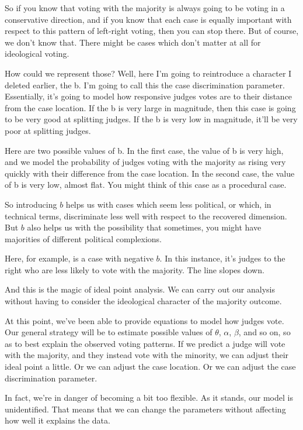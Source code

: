 \documentclass[12pt,twoside]{article}
\begin{document}
So if you know that voting with the majority is always going to be
voting in a conservative direction, and if you know that each case is
equally important with respect to this pattern of left-right voting,
then you can stop there. But of course, we don't know that. There might
be cases which don't matter at all for ideological voting.

How could we represent those? Well, here I'm going to reintroduce a
character I deleted earlier, the b. I'm going to call this the case
discrimination parameter. Essentially, it's going to model how
responsive judges votes are to their distance from the case location. If
the b is very large in magnitude, then this case is going to be very
good at splitting judges. If the b is very low in magnitude, it'll be
very poor at splitting judges.

Here are two possible values of b. In the first case, the value of b is
very high, and we model the probability of judges voting with the
majority as rising very quickly with their difference from the case
location. In the second case, the value of b is very low, almost flat.
You might think of this case as a procedural case.

So introducing \(b\) helps us with cases which seem less political, or
which, in technical terms, discriminate less well with respect to the
recovered dimension. But \(b\) also helps us with the possibility that
sometimes, you might have majorities of different political complexions.

Here, for example, is a case with negative \(b\). In this instance, it's
judges to the right who are less likely to vote with the majority. The
line slopes down.

And this is the magic of ideal point analysis. We can carry out our
analysis without having to consider the ideological character of the
majority outcome.

At this point, we've been able to provide equations to model how judges
vote. Our general strategy will be to estimate possible values of
\(\theta\), \(\alpha\), \(\beta\), and so on, so as to best explain the
observed voting patterns. If we predict a judge will vote with the
majority, and they instead vote with the minority, we can adjust their
ideal point a little. Or we can adjust the case location. Or we can
adjust the case discrimination parameter.

In fact, we're in danger of becoming a bit too flexible. As it stands,
our model is unidentified. That means that we can change the parameters
without affecting how well it explains the data.
\end{document}
